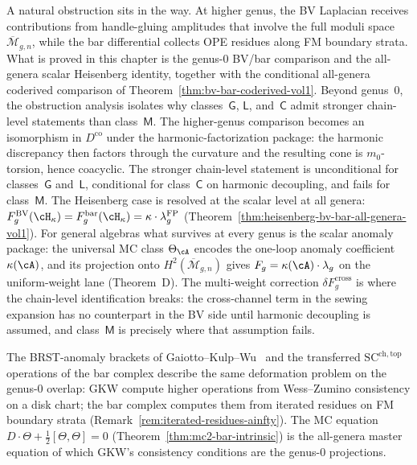 A natural obstruction sits in the way. At higher genus, the BV
Laplacian receives contributions from handle-gluing amplitudes that
involve the full moduli space $\overline{\mathcal{M}}_{g,n}$, while
the bar differential collects OPE residues along FM boundary strata.
What is proved in this chapter is the genus-$0$ BV/bar comparison
and the all-genera scalar Heisenberg identity, together with the
conditional all-genera coderived comparison of
Theorem~\ref{thm:bv-bar-coderived-vol1}. Beyond genus~$0$, the
obstruction analysis isolates why classes~$\mathsf{G}$,
$\mathsf{L}$, and~$\mathsf{C}$ admit stronger chain-level statements
than class~$\mathsf{M}$. The higher-genus comparison becomes an
isomorphism in $D^{\mathrm{co}}$ under the harmonic-factorization
package: the harmonic discrepancy then factors through the curvature
and the resulting cone is $m_0$-torsion, hence coacyclic. The stronger
chain-level statement is unconditional for
classes~$\mathsf{G}$ and~$\mathsf{L}$, conditional for
class~$\mathsf{C}$ on harmonic decoupling, and fails for
class~$\mathsf{M}$. The Heisenberg case is resolved at the
scalar level at all genera:
$F_g^{\mathrm{BV}}(\cH_\kappa) = F_g^{\mathrm{bar}}(\cH_\kappa)
= \kappa \cdot \lambda_g^{\mathrm{FP}}$
\textup{(}Theorem~\ref{thm:heisenberg-bv-bar-all-genera-vol1}\textup{)}.
For general algebras what survives at every genus is the scalar
anomaly package: the universal MC class $\Theta_\cA$ encodes the
one-loop anomaly coefficient $\kappa(\cA)$, and its projection
onto $H^2(\overline{\mathcal{M}}_{g,n})$ gives $F_g = \kappa(\cA) \cdot \lambda_g$
on the uniform-weight lane \textup{(}Theorem~D\textup{)}. The
multi-weight correction $\delta F_g^{\mathrm{cross}}$ is where the
chain-level identification breaks: the cross-channel term in the
sewing expansion has no counterpart in the BV side until
harmonic decoupling is assumed, and class~$\mathsf{M}$ is precisely
where that assumption fails.

\begin{remark}
\label{rem:brst-anomaly-gkw}
The BRST-anomaly brackets of Gaiotto--Kulp--Wu~\cite{GKW2025}
and the transferred $\mathrm{SC}^{\mathrm{ch,top}}$ operations of
the bar complex describe the same deformation problem on the
genus-$0$ overlap: GKW compute higher operations from Wess--Zumino
consistency on a disk chart; the bar complex computes them from
iterated residues on FM boundary strata
(Remark~\ref{rem:iterated-residues-ainfty}).
The MC equation $D \cdot \Theta + \tfrac{1}{2}[\Theta, \Theta] = 0$
(Theorem~\ref{thm:mc2-bar-intrinsic}) is the all-genera master
equation of which GKW's consistency conditions are the genus-$0$
projections.
\end{remark}

